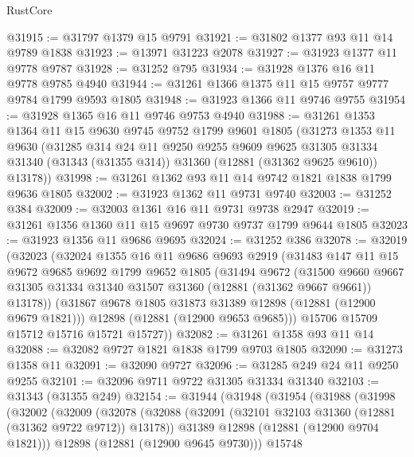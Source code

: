 \begin{lexlean}{RustCore}
\begin{coremodule}
@31915 := @31797 @1379 @15 @9791
@31921 := @31802 @1377 @93 @11 @14 @9789 @1838
@31923 := @13971 @31223 @2078
@31927 := @31923 @1377 @11 @9778 @9787
@31928 := @31252 @795
@31934 := @31928 @1376 @16 @11 @9778 @9785 @4940
@31944 := @31261 @1366 @1375 @11 @15 @9757 @9777 @9784 @1799 @9593 @1805
@31948 := @31923 @1366 @11 @9746 @9755
@31954 := @31928 @1365 @16 @11 @9746 @9753 @4940
@31988 := @31261
    @1353
    @1364
    @11
    @15
    @9630
    @9745
    @9752
    @1799
    @9601
    @1805
    (@31273
      @1353
      @11
      @9630
      (@31285
        @314
        @24
        @11
        @9250
        @9255
        @9609
        @9625
        @31305
        @31334
        @31340
        (@31343 (@31355 @314))
        @31360
        (@12881 (@31362 @9625 @9610))
        @13178))
@31998 := @31261 @1362 @93 @11 @14 @9742 @1821 @1838 @1799 @9636 @1805
@32002 := @31923 @1362 @11 @9731 @9740
@32003 := @31252 @384
@32009 := @32003 @1361 @16 @11 @9731 @9738 @2947
@32019 := @31261 @1356 @1360 @11 @15 @9697 @9730 @9737 @1799 @9644 @1805
@32023 := @31923 @1356 @11 @9686 @9695
@32024 := @31252 @386
@32078 := @32019
    (@32023
      (@32024
        @1355
        @16
        @11
        @9686
        @9693
        @2919
        (@31483
          @147
          @11
          @15
          @9672
          @9685
          @9692
          @1799
          @9652
          @1805
          (@31494
            @9672
            (@31500
              @9660
              @9667
              @31305
              @31334
              @31340
              @31507
              @31360
              (@12881 (@31362 @9667 @9661))
              @13178))
          (@31867 @9678 @1805 @31873 @31389 @12898 (@12881 (@12900 @9679 @1821)))
          @12898
          (@12881 (@12900 @9653 @9685)))
        @15706
        @15709
        @15712
        @15716
        @15721
        @15727))
@32082 := @31261 @1358 @93 @11 @14
@32088 := @32082 @9727 @1821 @1838 @1799 @9703 @1805
@32090 := @31273 @1358 @11
@32091 := @32090 @9727
@32096 := @31285 @249 @24 @11 @9250 @9255
@32101 := @32096 @9711 @9722 @31305 @31334 @31340
@32103 := @31343 (@31355 @249)
@32154 := @31944
    (@31948
      (@31954
        (@31988
          (@31998
            (@32002
              (@32009
                (@32078
                  (@32088
                    (@32091 (@32101 @32103 @31360 (@12881 (@31362 @9722 @9712)) @13178))
                    @31389
                    @12898
                    (@12881 (@12900 @9704 @1821)))
                  @12898
                  (@12881 (@12900 @9645 @9730)))
                @15748

\end{coremodule}
\end{lexlean}
